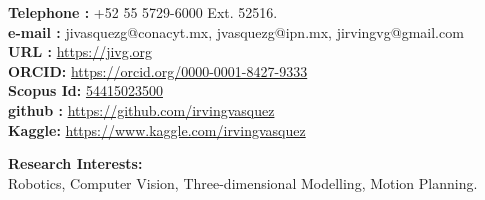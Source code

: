 \documentclass[10pt]{article}
\begin{document}
\begin{center}
\begin{minipage}[b]{0.6\linewidth}
			\textbf{Telephone \faPhone:} +52 55 5729-6000 Ext. 52516. \\
			\textbf{e-mail \faEnvelopeO:} jivasquezg@conacyt.mx, jvasquezg@ipn.mx, jirvingvg@gmail.com\\
			\textbf{URL \faExternalLink:} \url{https://jivg.org} \\
			\textbf{ORCID:} \url{https://orcid.org/0000-0001-8427-9333} \\
			\textbf{Scopus Id:} \href{https://www.scopus.com/authid/detail.uri?authorId=54415023500}{54415023500}\\
			\textbf{github \faGithub :} \url{https://github.com/irvingvasquez} \\
			\textbf{Kaggle:} \url{https://www.kaggle.com/irvingvasquez}
		\end{minipage}
			
	\end{center}


\begin{center}
{\bf Research Interests:} \\ Robotics, Computer Vision, Three-dimensional Modelling, Motion Planning.
\end{center}
\end{document}
